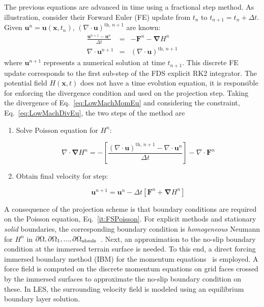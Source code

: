 \documentclass[journal,article,atmosphere,submit,moreauthors,pdftex]{Definitions_Review_Process/mdpi}
\begin{document}
The previous equations are advanced in time using a fractional step method. As illustration, consider their Forward Euler (FE) update from $t_n$ to $t_{n+1}=t_n + \Delta t$. Given $ \mathbf{u}^n=\mathbf{u}(\mathbf{x},t_n)$, $\left( \nabla \cdot \mathbf{u} \right)^{\mathrm{th},\,n+1}$ are known:
\begin{eqnarray}
  \frac{\mathbf{u}^{n+1}-\mathbf{u}^{n}}{\Delta t} &=& - \mathbf{F}^n -  \boldsymbol{\nabla} H^n \label{eq:LowMachMomEu}\\
  \nabla \cdot \mathbf{u}^{n+1} &=& \left( \nabla \cdot \mathbf{u} \right)^{\mathrm{th},\,n+1} \label{eq:LowMachDivEu}
\end{eqnarray}
where $\mathbf{u}^{n+1}$ represents a numerical solution at time $t_{n+1}$. This discrete FE update corresponds to the first sub-step of the FDS explicit RK2 integrator. The potential field $H(\mathbf{x},t)$ does not have a time evolution equation, it is responsible for enforcing the divergence condition and used on the projection step. Taking the divergence of Eq.~\eqref{eq:LowMachMomEu} and considering  the constraint, Eq.~\eqref{eq:LowMachDivEu}, the two steps of the method are
\begin{enumerate}
  \item Solve Poisson equation for $H^n$:

\begin{equation}
   \nabla \cdot \boldsymbol{\nabla} H^n = - \left[ \frac{\left( \nabla \cdot \mathbf{u} \right)^{\mathrm{th},\,n+1} - \nabla \cdot \mathbf{u}^{n}}{\Delta t} \right] - \nabla \cdot \mathbf{F}^n \label{it:FSPoisson}
\end{equation}

  \item Obtain final velocity for step:

  \begin{equation}
     \mathbf{u}^{n+1} = \mathbf{u}^{n} - \Delta t \left[ \mathbf{F}^n +  \boldsymbol{\nabla} H^n \right] \label{it:FSProject}
   \end{equation}

\end{enumerate}
A consequence of the projection scheme is that boundary conditions are required on the Poisson equation, Eq.~\eqref{it:FSPoisson}. For explicit methods and stationary \textit{solid} boundaries, the corresponding boundary condition is \textit{homogeneous} Neumann for $H^n$ in $\partial \Omega,\partial \Omega_1,...,\partial \Omega_{\rm nbods}$~\cite{perot_1993}.
Next, an approximation to the no-slip boundary condition at the immersed terrain surface is needed. To this end, a direct forcing immersed boundary method (IBM) for the momentum equations~\cite{fadlun_2000} is employed. A force field is computed on the discrete momentum equations on grid faces crossed by the immersed surfaces to approximate the no-slip boundary condition on these. In LES, the surrounding velocity field is modeled using an equilibrium boundary layer solution.
\end{document}
